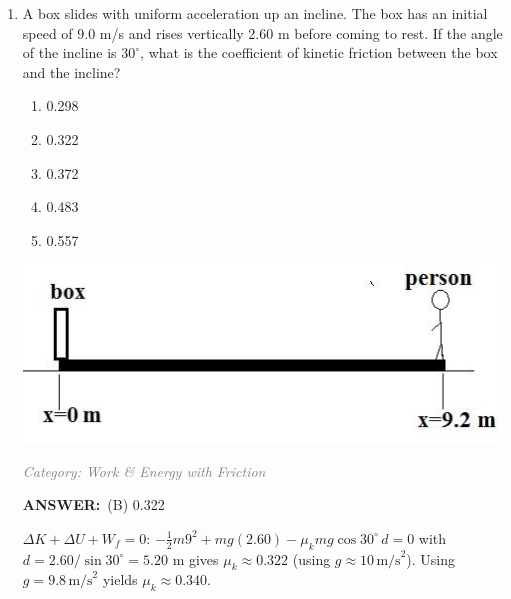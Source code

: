 ﻿\documentclass[12pt, a4paper]{article}
\makeatletter
\newcommand{\finalanswer}[1]{\textbf{ANSWER:}~#1}
\newif\if@categoryprinted
\newcommand{\category}[1]{\if@categoryprinted\relax\else\textit{\textcolor{gray}{Category: #1}}\global\@categoryprintedtrue\fi}
\makeatother
\begin{document}
\begin{CJK*}{UTF8}{gbsn}
\begin{enumerate}[itemsep=1.0em, topsep=0.6em]
\item \label{prob:28}
\noindent\begin{minipage}[t]{0.6\linewidth}
\vspace{0pt}
A box slides with uniform acceleration up an incline. The box has an initial speed of 9.0 m/s and rises vertically 2.60 m before coming to rest. If the angle of the incline is $30^\circ$, what is the coefficient of kinetic friction between the box and the incline?
\begin{enumerate}[label=(\Alph*)]
    \item 0.298
    \item 0.322
    \item 0.372
    \item 0.483
    \item 0.557
\end{enumerate}
\end{minipage}%
\hfill
\begin{minipage}[t]{0.35\linewidth}
\vspace{0pt}
\centering
\includegraphics[width=\linewidth]{Problem_29_Figure.png}
\end{minipage}

\category{Work \& Energy with Friction}
\begin{answerbox}
\finalanswer{(B) 0.322}
\end{answerbox}
\begin{solutionbox}

$\Delta K+\Delta U+W_f=0$: $-\tfrac{1}{2}m9^2 + mg(2.60) - \mu_k mg\cos30^\circ\,d=0$ with $d=2.60/\sin30^\circ=5.20$ m gives $\mu_k\approx0.322$ (using $g\approx10\,\text{m/s}^2$). Using $g=9.8\,\text{m/s}^2$ yields $\mu_k\approx0.340$.
\end{solutionbox}

\newpage


\end{enumerate}
\end{CJK*}
\end{document}
